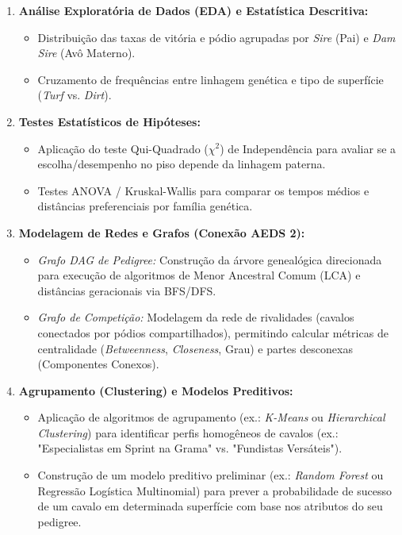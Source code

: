 \documentclass[11pt,a4paper]{article}
\begin{document}
\begin{enumerate}
    \item \textbf{Análise Exploratória de Dados (EDA) e Estatística Descritiva:}
    \begin{itemize}
        \item Distribuição das taxas de vitória e pódio agrupadas por \emph{Sire} (Pai) e \emph{Dam Sire} (Avô Materno).
        \item Cruzamento de frequências entre linhagem genética e tipo de superfície (\emph{Turf} vs. \emph{Dirt}).
    \end{itemize}
    
    \item \textbf{Testes Estatísticos de Hipóteses:}
    \begin{itemize}
        \item Aplicação do teste Qui-Quadrado ($\chi^2$) de Independência para avaliar se a escolha/desempenho no piso depende da linhagem paterna.
        \item Testes ANOVA / Kruskal-Wallis para comparar os tempos médios e distâncias preferenciais por família genética.
    \end{itemize}

    \item \textbf{Modelagem de Redes e Grafos (Conexão AEDS 2):}
    \begin{itemize}
        \item \emph{Grafo DAG de Pedigree:} Construção da árvore genealógica direcionada para execução de algoritmos de Menor Ancestral Comum (LCA) e distâncias geracionais via BFS/DFS.
        \item \emph{Grafo de Competição:} Modelagem da rede de rivalidades (cavalos conectados por pódios compartilhados), permitindo calcular métricas de centralidade (\emph{Betweenness}, \emph{Closeness}, Grau) e partes desconexas (Componentes Conexos).
    \end{itemize}

    \item \textbf{Agrupamento (Clustering) e Modelos Preditivos:}
    \begin{itemize}
        \item Aplicação de algoritmos de agrupamento (ex.: \emph{K-Means} ou \emph{Hierarchical Clustering}) para identificar perfis homogêneos de cavalos (ex.: "Especialistas em Sprint na Grama" vs. "Fundistas Versáteis").
        \item Construção de um modelo preditivo preliminar (ex.: \emph{Random Forest} ou Regressão Logística Multinomial) para prever a probabilidade de sucesso de um cavalo em determinada superfície com base nos atributos do seu pedigree.
    \end{itemize}
\end{enumerate}
\end{document}
